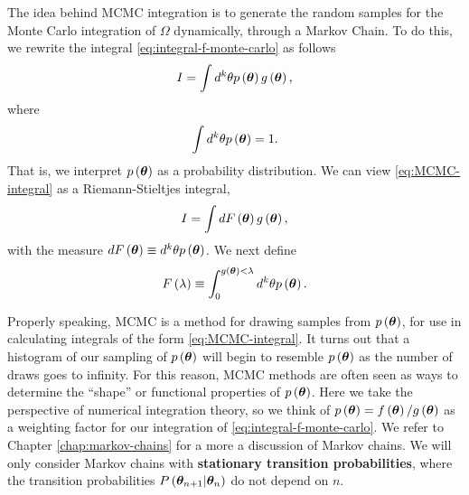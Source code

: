 The idea behind MCMC integration 
is to generate the random samples for the Monte Carlo
integration of $\Omega$ dynamically, through a Markov Chain. 
To do this, we rewrite the integral \eqref{eq:integral-f-monte-carlo} as follows
\begin{align}
    \label{eq:MCMC-integral}
    I
    =
    \int d^k\theta p\left({\bm \theta}\right)g\left({\bm \theta}\right) 
    ,
\end{align}
where
\begin{align}
    \int d^k\theta p\left({\bm \theta}\right)
    =
    1
    .
\end{align}
That is, we interpret $p\left({\bm \theta}\right)$ as a probability distribution.
We can view \eqref{eq:MCMC-integral} as a Riemann-Stieltjes integral,
\begin{align}
    \label{eq:riemann-steiltjes-integral}
    I
    =
    \int dF\left({\bm \theta}\right) g\left({\bm \theta}\right)
    ,
\end{align}
with the measure $dF\left({\bm \theta}\right) \equiv d^k\theta p\left({\bm \theta}\right)$.
We next define
\begin{align}
    \label{eq:F-RS-int}
    F\left(\lambda\right)
    \equiv
    \int_0^{g\left({\bm \theta}\right)<\lambda} d^k\theta p\left({\bm \theta}\right)
    .
\end{align}

Properly speaking, MCMC is a method for drawing samples from $p\left({\bm \theta}\right)$, for use in calculating integrals of the form \eqref{eq:MCMC-integral}.
It turns out that a histogram of our sampling of $p\left({\bm \theta}\right)$ will begin to resemble $p\left({\bm \theta}\right)$ as the number of draws goes to infinity.
For this reason, MCMC methods are often seen as ways to determine the ``shape''
or functional properties of $p\left({\bm \theta}\right)$.
Here we take the perspective of numerical integration theory, so we think of 
$p\left({\bm \theta}\right) = f\left({\bm \theta}\right)/g\left({\bm \theta}\right)$ 
as a weighting factor for our integration of \eqref{eq:integral-f-monte-carlo}. 
We refer to Chapter \ref{chap:markov-chains} for a more a discussion of Markov chains.
We will only consider Markov chains with \textbf{stationary transition probabilities}, where the transition probabilities $P\left({\bm \theta}_{n+1}|{\bm \theta}_n\right)$ do not depend on $n$.

